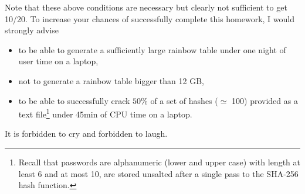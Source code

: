 \documentclass[a4paper,11pt]{article}
\begin{document}
Note that these above conditions are necessary but clearly not sufficient to get 10/20. To increase your chances of successfully complete this homework, I would strongly advise
\begin{itemize}
\item to be able to generate a sufficiently large rainbow table under one night of user time on a laptop,
\item not to generate a rainbow table bigger than 12 GB,
\item to be able to successfully crack $50$\% of a set of hashes ($\simeq$ 100) provided as a text file\footnote{Recall that passwords are alphanumeric (lower and upper case) with length at least 6 and at most 10, are stored unsalted after a single pass to the SHA-256 hash function.} under 45min of CPU time on a laptop.\\
\end{itemize}

It is forbidden to cry and forbidden to laugh.
\end{document}
